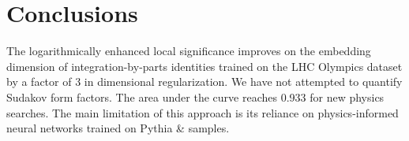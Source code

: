 \section{Conclusions}\label{sec:conclusions}

The logarithmically enhanced local significance improves on the
embedding dimension of integration-by-parts identities trained on the
LHC Olympics dataset by a factor of 3 in dimensional regularization. We
have not attempted to quantify Sudakov form factors. The area under the
curve reaches 0.933 for new physics searches. The main limitation of
this approach is its reliance on physics-informed neural networks
trained on Pythia & samples.

